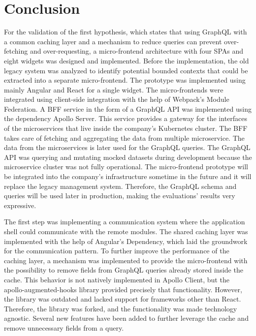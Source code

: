 \chapter{Conclusion}\label{chapter:conclusion}

\noindent For the validation of the first hypothesis, which states that using GraphQL with a common caching layer and a mechanism to reduce queries can prevent over-fetching and over-requesting, a micro-frontend architecture with four \acp{SPA} and eight widgets was designed and implemented. Before the implementation, the old legacy system was analyzed to identify potential bounded contexts that could be extracted into a separate micro-frontend. The prototype was implemented using mainly Angular and React for a single widget. The micro-frontends were integrated using client-side integration with the help of Webpack's Module Federation. A \ac{BFF} service in the form of a GraphQL \ac{API} was implemented using the dependency Apollo Server. This service provides a gateway for the interfaces of the microservices that live inside the company's Kubernetes cluster. The \ac{BFF} takes care of fetching and aggregating the data from multiple microservice. The data from the microservices is later used for the GraphQL queries. The GraphQL \ac{API} was querying and mutating mocked datasets during development because the microservice cluster was not fully operational. The micro-frontend prototype will be integrated into the company's infrastructure sometime in the future and it will replace the legacy management system. Therefore, the GraphQL schema and queries will be used later in production, making the evaluations' results very expressive.

\bigskip

\noindent The first step was implementing a communication system where the application shell could communicate with the remote modules. The shared caching layer was implemented with the help of Angular's Dependency, which laid the groundwork for the communication pattern. To further improve the performance of the caching layer, a mechanism was implemented to provide the micro-frontend with the possibility to remove fields from GraphQL queries already stored inside the cache. This behavior is not natively implemented in Apollo Client, but the apollo-augmented-hooks library provided precisely that functionality. However, the library was outdated and lacked support for frameworks other than React. Therefore, the library was forked, and the functionality was made technology agnostic. Several new features have been added to further leverage the cache and remove unnecessary fields from a query.

